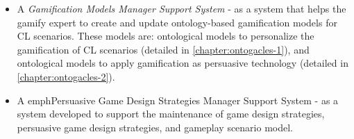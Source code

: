 \begin{itemize}
\item A \emph{Gamification Models Manager Support System} - as a system that helps the gamify
expert to create and update ontology-based gamification models for CL scenarios.  These models are: ontological models
to personalize the gamification of CL scenarios (detailed in \autoref{chapter:ontogacles-1}), and ontological models to
apply gamification as persuasive technology (detailed in \autoref{chapter:ontogacles-2}).


\item A emph{Persuasive Game Design Strategies Manager Support System} - as a system developed to support the
maintenance of game design strategies, persuasive game design strategies, and gameplay scenario model.
\end{itemize}







